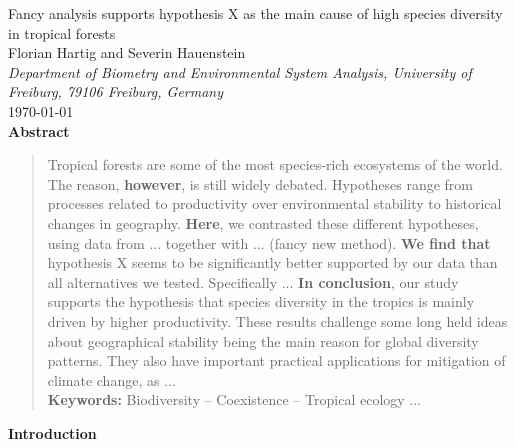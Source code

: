 \documentclass{tufte-book}
\begin{document}
\begin{center}
	\huge{Fancy analysis supports hypothesis X as the main cause of high species diversity in tropical forests} \\
	\vspace{0.3em}
	\large{Florian Hartig and Severin Hauenstein}\\
	\vspace{0.3em}
	\small{\textit{Department of Biometry and Environmental System Analysis, University of Freiburg, 79106 Freiburg, Germany}}\\
	\vspace{1em}
	\large{\today}\\
	\vspace{2em}
	\textbf{Abstract}\\ 
\end{center}
\begin{quote}
Tropical forests are some of the most species-rich ecosystems of the world.
The reason, \textbf{however}, is still widely debated. Hypotheses range from processes related to productivity over environmental stability to historical changes in geography.
\textbf{Here}, we contrasted these different hypotheses, using data from ... together with ... (fancy new method).
\textbf{We find that} hypothesis X seems to be significantly better supported by our data
than all alternatives we tested. Specifically ...
\textbf{In conclusion}, our study supports the hypothesis that species diversity in the
tropics is mainly driven by higher productivity. These results challenge some long held
ideas about geographical stability being the main reason for global diversity
patterns. They also have important practical applications for mitigation of climate
change, as ...\\[0.3cm]
\noindent\textbf{Keywords:} Biodiversity -- Coexistence -- Tropical ecology ...\\
\end{quote}

\noindent\textbf{Introduction}\\[0.3cm]
\end{document}
